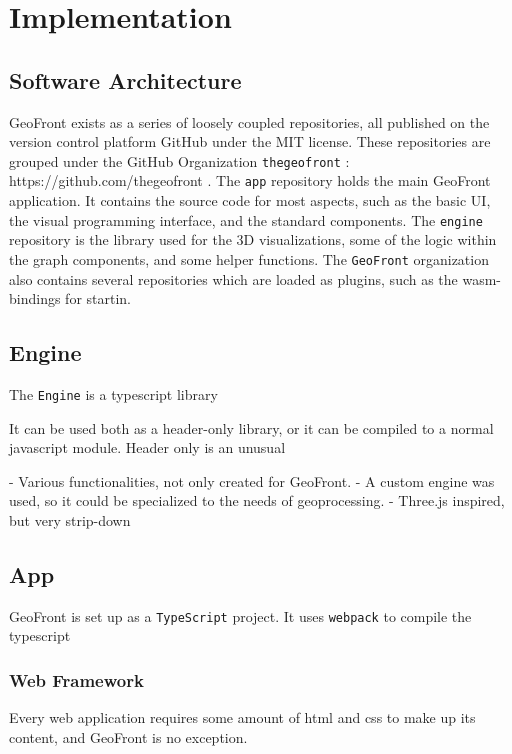 \chapter{Implementation}%

\section{Software Architecture}
GeoFront exists as a series of loosely coupled repositories, all published on the version control platform GitHub under the MIT license. These repositories are grouped under the GitHub Organization \verb|thegeofront| : https://github.com/thegeofront .
The \verb|app| repository holds the main GeoFront application. It contains the source code for most aspects, such as the basic UI, the visual programming interface, and the standard components. 
The \verb|engine| repository is the library used for the 3D visualizations, some of the logic within the graph components, and some helper functions.
The \verb|GeoFront| organization also contains several repositories which are loaded as plugins, such as the wasm-bindings for startin.

\section{Engine}
The \verb|Engine| is a typescript library 

It can be used both as a header-only library, or it can be compiled to a normal javascript module. 
Header only is an unusual 

- Various functionalities, not only created for GeoFront.
- A custom engine was used, so it could be specialized to the needs of geoprocessing. 
- Three.js inspired, but very strip-down

\section{App}
GeoFront is set up as a \verb|TypeScript| project. It uses \verb|webpack| to compile the typescript 

\subsection{Web Framework}
Every web application requires some amount of html and css to make up its content, and GeoFront is no exception. 



